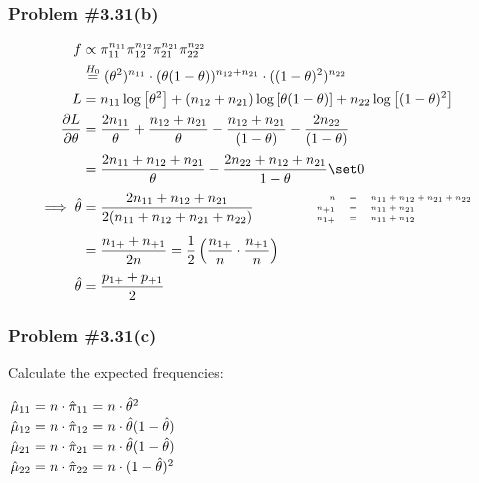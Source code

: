 \documentclass[12pt, letterpaper]{article}
\begin{document}
\newpage 
\subsubsection*{Problem {\#}3.31(b)} 
\begin{align*}
f & \propto \pi_{11}^{n_{11}} \pi_{12}^{n_{12}} \pi_{21}^{n_{21}} \pi_{22}^{n_{22}}
\\
& \stackrel{H_0}{=} (\theta^2)^{n_{11}} \cdot (\theta(1 - \theta))^{n_{12}+n_{21}} \cdot ((1 - \theta)^2)^{n_{22}}
\\
L & =  n_{11} \log\left[ \theta^2 \right] + (n_{12} + n_{21}) \log \left[ \theta(1 - \theta) \right] + n_{22} \log \left[ (1 - \theta)^2 \right] 
\\
\frac{ \partial L}{ \partial \theta} & = \frac{2 n_{11}}{\theta} + \frac{n_{12} + n_{21}}{\theta} - \frac{n_{12} + n_{21}}{(1 - \theta)} - \frac{ 2 n_{22} }{(1 - \theta) }
\\[0.5ex]
& = \frac{ 2 n_{11} + n_{12} + n_{21}}{\theta} - \frac{2 n_{22} + n_{12} + n_{21}}{1 - \theta} \set 0 
\\[0.5ex]
\implies \hat{\theta} & = \frac{ 2 n_{11} + n_{12} + n_{21} }{2(n_{11} + n_{12} + n_{21} + n_{22}  )} 
\qquad \qquad  \begin{tiny}
\begin{array}{r c l}
n &=& n_{11} + n_{12} + n_{21} + n_{22} \\
n_{+1} &=&  n_{11} + n_{21} \\
n_{1+} &=& n_{11} + n_{12}
\end{array}
\end{tiny}
\\[1ex]
& = \frac{ n_{1+} + n_{+1} }{2 n} = \frac{1}{2} \left( \frac{n_{1+}}{n} \cdot \frac{n_{+1}}{n} \right)  
\\[0.5ex]
\hat{\theta} &= \frac{ p_{1+} + p_{+1} }{2}
\end{align*}

\subsubsection*{Problem {\#}3.31(c)}

Calculate the expected frequencies: 

$
\arraycolsep=1.5pt \def\arraystretch{1.2}
\begin{array}{r c l c l}
\hat{\mu}_{11} & = & n \cdot \hat{\pi}_{11} &=& n \cdot \hat{\theta}^2 \\
\hat{\mu}_{12} & = &n \cdot \hat{\pi}_{12} &=& n \cdot \hat{\theta}(1 - \hat{\theta}) \\ 
\hat{\mu}_{21} & = &n \cdot \hat{\pi}_{21} &=& n \cdot \hat{\theta}(1 - \hat{\theta}) \\
\hat{\mu}_{22} & = &n \cdot \hat{\pi}_{22} &=& n \cdot (1 - \hat{\theta})^2
\end{array}$ 
\end{document}
